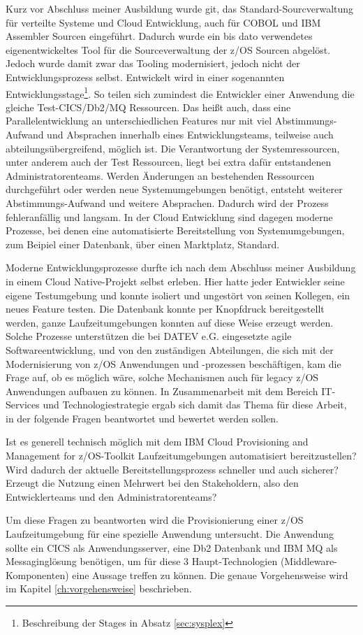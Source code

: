 Kurz vor Abschluss meiner Ausbildung wurde git, das Standard-Sourcverwaltung für verteilte Systeme und Cloud Entwicklung, auch für COBOL und IBM Assembler Sourcen eingeführt.
Dadurch wurde ein bis dato verwendetes eigenentwickeltes Tool für die Sourceverwaltung der z/OS Sourcen abgelöst.
Jedoch wurde damit zwar das Tooling modernisiert, jedoch nicht der Entwicklungsprozess selbst.
Entwickelt wird in einer sogenannten \glqq Entwicklungsstage\grqq{}\footnote{Beschreibung der Stages in Absatz \ref{sec:sysplex}}. 
So teilen sich zumindest die Entwickler einer Anwendung die gleiche Test-CICS/Db2/MQ Ressourcen.
Das heißt auch, dass eine Parallelentwicklung an unterschiedlichen Features nur mit viel Abstimmungs-Aufwand und Absprachen innerhalb eines Entwicklungsteams, teilweise auch abteilungsübergreifend, möglich ist.
Die Verantwortung der Systemressourcen, unter anderem auch der Test Ressourcen, liegt bei extra dafür entstandenen Administratorenteams.
Werden Änderungen an bestehenden Ressourcen durchgeführt oder werden neue Systemumgebungen benötigt, entsteht weiterer Abstimmungs-Aufwand und weitere Absprachen.
Dadurch wird der Prozess fehleranfällig und langsam.
In der Cloud Entwicklung sind dagegen moderne Prozesse, bei denen eine automatisierte Bereitstellung von Systemumgebungen, zum Beipiel einer Datenbank, über einen \glqq Marktplatz\grqq, Standard. 

Moderne Entwicklungsprozesse durfte ich nach dem Abschluss meiner Ausbildung in einem \glqq Cloud Native\grqq-Projekt selbst erleben.
Hier hatte jeder Entwickler seine eigene Testumgebung und konnte isoliert und ungestört von seinen Kollegen, ein neues Feature testen.
Die Datenbank konnte per Knopfdruck bereitgestellt werden, ganze Laufzeitumgebungen konnten auf diese Weise erzeugt werden.
Solche Prozesse unterstützen die bei DATEV e.G. eingesetzte agile Softwareentwicklung, und von den zuständigen Abteilungen, die sich mit der Modernisierung von z/OS Anwendungen und -prozessen beschäftigen,  kam die Frage auf, ob es möglich wäre, solche Mechanismen auch für legacy z/OS Anwendungen aufbauen zu können.
In Zusammenarbeit mit dem Bereich IT-Services und Technologiestrategie ergab sich damit das Thema für diese Arbeit, in der folgende Fragen beantwortet und bewertet werden sollen.

Ist es generell technisch möglich mit dem \glqq IBM Cloud Provisioning and Management for z/OS\grqq-Toolkit Laufzeitumgebungen automatisiert bereitzustellen?
Wird dadurch der aktuelle Bereitstellungsprozess schneller und auch sicherer?
Erzeugt die Nutzung einen Mehrwert bei den Stakeholdern, also den Entwicklerteams und den Administratorenteams?

Um diese Fragen zu beantworten wird die Provisionierung einer z/OS Laufzeitumgebung für eine spezielle Anwendung untersucht.
Die Anwendung sollte ein CICS als Anwendungsserver, eine Db2 Datenbank und IBM MQ als Messaginglösung benötigen, um für diese 3 Haupt-Technologien (Middleware-Komponenten) eine Aussage treffen zu können.
Die genaue Vorgehensweise wird im Kapitel \ref{ch:vorgehensweise} beschrieben.
